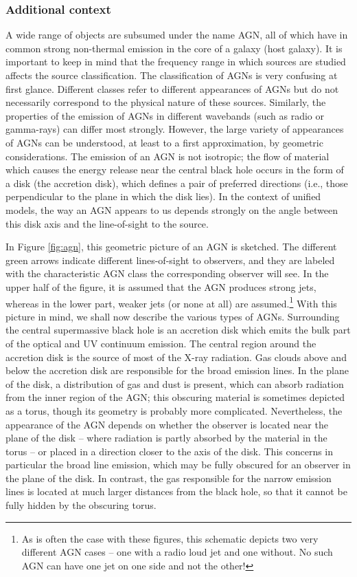 \documentclass[a4paper,10pt]{article}
\begin{document}
\subsubsection{Additional context}

A wide range of objects are subsumed under the name AGN, all of which have in common strong non-thermal emission in the core of a galaxy (host galaxy). It is important to keep in mind that the frequency range in which sources are studied affects the source classification. The classification of AGNs is very confusing at first glance. Different classes refer to different appearances of AGNs but do not necessarily correspond to the physical nature of these sources. Similarly, the properties of the emission of AGNs in different wavebands (such as radio or gamma-rays) can differ most strongly. However, the large variety of appearances of AGNs can be understood, at least to a first approximation, by geometric considerations. The emission of an AGN is not isotropic; the flow of material which causes the energy release near the central black hole occurs in the form of a disk (the accretion disk), which defines a pair of preferred directions (i.e., those perpendicular to the plane in which the disk lies). In the context of unified models, the way an AGN appears to us depends strongly on the angle between this disk axis and the line-of-sight to the source.

{\noindent}In Figure \ref{fig:agn}, this geometric picture of an AGN is sketched. The different green arrows indicate different lines-of-sight to observers, and they are labeled with the characteristic AGN class the corresponding observer will see. In the upper half of the figure, it is assumed that the AGN produces strong jets, whereas in the lower part, weaker jets (or none at all) are assumed.\footnote{As is often the case with these figures, this schematic depicts two very different AGN cases -- one with a radio loud jet and one without. No such AGN can have one jet on one side and not the other!} With this picture in mind, we shall now describe the various types of AGNs. Surrounding the central supermassive black hole is an accretion disk which emits the bulk part of the optical and UV continuum emission. The central region around the accretion disk is the source of most of the X-ray radiation. Gas clouds above and below the accretion disk are responsible for the broad emission lines. In the plane of the disk, a distribution of gas and dust is present, which can absorb radiation from the inner region of the AGN; this obscuring material is sometimes depicted as a torus, though its geometry is probably more complicated. Nevertheless, the appearance of the AGN depends on whether the observer is located near the plane of the disk -- where radiation is partly absorbed by the material in the torus -- or placed in a direction closer to the axis of the disk. This concerns in particular the broad line emission, which may be fully obscured for an observer in the plane of the disk. In contrast, the gas responsible for the narrow emission lines is located at much larger distances from the black hole, so that it cannot be fully hidden by the obscuring torus. 
\end{document}
